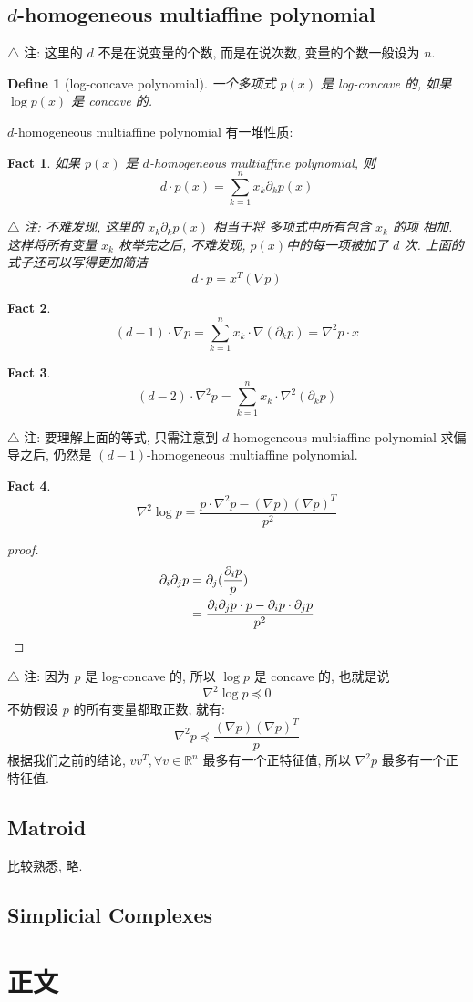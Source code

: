 \documentclass{article}
\newtheorem{define}{Define}
\newtheorem{fact}{Fact}
\begin{document}
\subsection{$d$-homogeneous multiaffine polynomial}

$\triangle$ 注: 这里的 $d$ 不是在说变量的个数, 而是在说次数, 变量的个数一般设为 $n$.

\begin{define}[log-concave polynomial]
  一个多项式 $p(x)$ 是 log-concave 的, 如果 $\log p(x)$ 是 concave 的.
\end{define}
$d$-homogeneous multiaffine polynomial 有一堆性质:
\begin{fact}
  如果 $p(x)$ 是 $d$-homogeneous multiaffine polynomial, 则
  \[d \cdot p(x) = \sum_{k=1}^n x_k\partial_kp(x)\]

  $\triangle$ 注: 不难发现, 这里的 $x_k\partial_kp(x)$ 相当于将 多项式中所有包含 $x_k$ 的项 相加. 这样将所有变量 $x_k$ 枚举完之后, 不难发现, $p(x)$中的每一项被加了 $d$ 次.
  上面的式子还可以写得更加简洁
  \[d\cdot p = x^T(\nabla p)\]
\end{fact}
\begin{fact}
  \[(d-1)\cdot \nabla p = \sum_{k=1}^n x_k \cdot \nabla(\partial_kp) = \nabla^2p\cdot x\]
\end{fact}
\begin{fact}
  \[(d-2)\cdot \nabla^2p = \sum_{k=1}^n x_k\cdot \nabla^2(\partial_kp)\]
\end{fact}
$\triangle$ 注: 要理解上面的等式, 只需注意到 $d$-homogeneous multiaffine polynomial 求偏导之后, 仍然是 $(d-1)$-homogeneous multiaffine polynomial.
\begin{fact}
  \[\nabla^2 \log p = \frac{p\cdot \nabla^2p - (\nabla p)(\nabla p)^T}{p^2}\]
\end{fact}
\begin{proof}[proof]
  \begin{align*}
    \partial_i\partial_jp &= \partial_j(\frac{\partial_i p}{p}) \\
    &= \frac{\partial_i\partial_j p \cdot p - \partial_ip\cdot \partial_jp}{p^2} \qedhere
  \end{align*}
\end{proof}
  $\triangle$ 注: 因为 $p$ 是 log-concave 的, 所以 $\log p$ 是 concave 的, 也就是说
  \[\nabla^2\log p \preccurlyeq 0\]
  不妨假设 $p$ 的所有变量都取正数, 就有:
  \[\nabla^2p \preccurlyeq \frac{(\nabla p)(\nabla p)^T}{p}\]
  根据我们之前的结论, $vv^T, \forall v\in \mathbb{R}^n$ 最多有一个正特征值, 所以 $\nabla^2 p$ 最多有一个正特征值.
\subsection{Matroid}
 比较熟悉, 略.
\subsection{Simplicial Complexes}

\section{正文}
\end{document}
